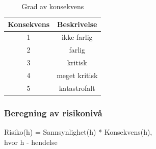 \begin{table}[H]
\centering
\begin{tabular}{|c|c|} 
\hline
Konsekvens & Beskrivelse\\
\hline\hline
1 & ikke farlig\\
\hline
2 & farlig\\
\hline
3 & kritisk\\
\hline
4 & meget kritisk\\
\hline
5 & katastrofalt\\
\hline
\end{tabular}
\caption{Grad av konsekvens \cite{4-forelesning-risikonalyse}}
\label{table2}
\end{table} 

\subsubsection*{Beregning av risikonivå}

Risiko(h) = Sannsynlighet(h) * Konsekvens(h),\\ hvor h - hendelse \cite{4-forelesning-risikonalyse}  

